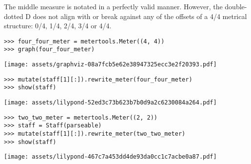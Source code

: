 The middle measure is notated in a perfectly valid manner. However, the
double-dotted D does not align with or break against any of the offsets of a
4/4 metrical structure: 0/4, 1/4, 2/4, 3/4 or 4/4.

\begin{comment}
<abjad>
four_four_meter = metertools.Meter((4, 4))
graph(four_four_meter)
</abjad>
\end{comment}

\begin{singlespacing}
\vspace{-0.5\baselineskip}
\begin{lstlisting}
>>> four_four_meter = metertools.Meter((4, 4))
>>> graph(four_four_meter)
\end{lstlisting}
\noindent\texttt{[image: assets/graphviz-08a7fcb5e62e38947325ecc3e2f20393.pdf]}
\end{singlespacing}

\begin{comment}
<abjad>
mutate(staff[1][:]).rewrite_meter(four_four_meter)
show(staff)
</abjad>
\end{comment}

\begin{singlespacing}
\vspace{-0.5\baselineskip}
\begin{lstlisting}
>>> mutate(staff[1][:]).rewrite_meter(four_four_meter)
>>> show(staff)
\end{lstlisting}
\noindent\texttt{[image: assets/lilypond-52ed3c73b623b7b0d9a2c6230084a264.pdf]}
\end{singlespacing}

\begin{comment}
<abjad>
two_two_meter = metertools.Meter((2, 2))
staff = Staff(parseable)
mutate(staff[1][:]).rewrite_meter(two_two_meter)
show(staff)
</abjad>
\end{comment}

\begin{singlespacing}
\vspace{-0.5\baselineskip}
\begin{lstlisting}
>>> two_two_meter = metertools.Meter((2, 2))
>>> staff = Staff(parseable)
>>> mutate(staff[1][:]).rewrite_meter(two_two_meter)
>>> show(staff)
\end{lstlisting}
\noindent\texttt{[image: assets/lilypond-467c7a453dd4de93da0cc1c7acbe0a87.pdf]}
\end{singlespacing}

